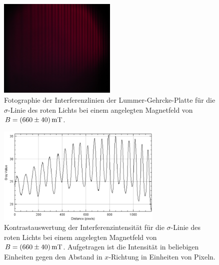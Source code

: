 \begin{figure}
  \centering
  \includegraphics[width=0.5\textwidth]{bilder/2995_ROT_621mT_sigma.jpg}
  \caption{Fotographie der Interferenzlinien der Lummer-Gehrcke-Platte für die $\sigma$-Linie des roten Lichts bei einem angelegten Magnetfeld von $B=\SI{660 \pm 40}{\milli\tesla}$.}
  \label{abb:sigmarot660mT}
\end{figure}
\begin{figure}
  \centering
  \includegraphics[width=0.7\textwidth]{bilder/sigmaROT_620mT.PNG}
  \caption{Kontrastauswertung der Interferenzintensität für die $\sigma$-Linie des roten Lichts bei einem angelegten Magnetfeld von $B=\SI{660 \pm 40}{\milli\tesla}$. Aufgetragen ist die Intensität in beliebigen Einheiten gegen den Abstand in $x$-Richtung in Einheiten von Pixeln.}
  \label{abb:plotsigmarot660mT}
\end{figure}

